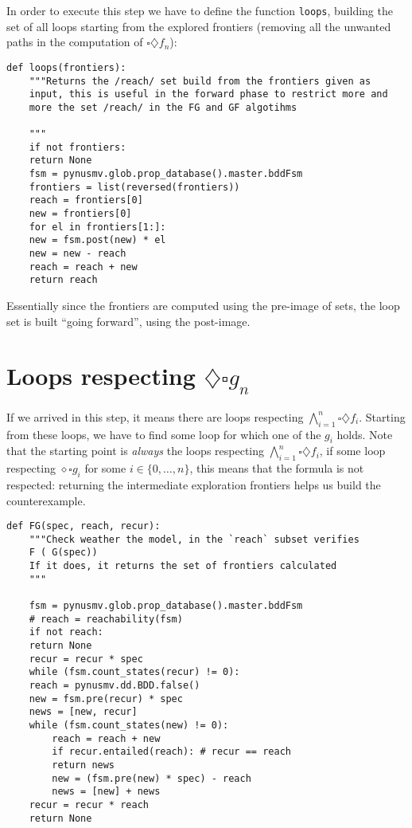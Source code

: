 \documentclass[10pt]{article}
\begin{document}
In order to execute this step we have to define the function
\texttt{loops}, building the set of all loops starting from the explored
frontiers (removing all the unwanted paths in the computation of
\(\square\diamondsuit f_n\)):

\begin{verbatim}
def loops(frontiers):
    """Returns the /reach/ set build from the frontiers given as
    input, this is useful in the forward phase to restrict more and
    more the set /reach/ in the FG and GF algotihms

    """
    if not frontiers:
	return None
    fsm = pynusmv.glob.prop_database().master.bddFsm
    frontiers = list(reversed(frontiers))
    reach = frontiers[0]
    new = frontiers[0]
    for el in frontiers[1:]:
	new = fsm.post(new) * el
	new = new - reach
	reach = reach + new
    return reach
\end{verbatim}
Essentially since the frontiers are computed using the pre-image of
sets, the loop set is built ``going forward'', using the post-image.

\section*{Loops respecting \(\diamondsuit\square g_n\)}
\label{sec:org46b46ad}
If we arrived in this step, it means there are loops respecting
\(\bigwedge_{i=1}^n\square\diamondsuit f_i\). Starting from these
loops, we have to find some loop for which one of the \(g_i\)
holds. Note that the starting point is \emph{always} the loops respecting
\(\bigwedge_{i=1}^n\square\diamondsuit f_i\), if some loop
respecting \(\diamond\square g_i\) for some \(i\in \{0,\dots,n\}\),
this means that the formula is not respected: returning the
intermediate exploration frontiers helps us build the
counterexample.

\begin{verbatim}
def FG(spec, reach, recur):
    """Check weather the model, in the `reach` subset verifies
    F ( G(spec))
    If it does, it returns the set of frontiers calculated
    """

    fsm = pynusmv.glob.prop_database().master.bddFsm
    # reach = reachability(fsm)
    if not reach:
	return None
    recur = recur * spec
    while (fsm.count_states(recur) != 0):
	reach = pynusmv.dd.BDD.false()
	new = fsm.pre(recur) * spec
	news = [new, recur]
	while (fsm.count_states(new) != 0):
	    reach = reach + new 
	    if recur.entailed(reach): # recur == reach
		return news
	    new = (fsm.pre(new) * spec) - reach
	    news = [new] + news
	recur = recur * reach
    return None
\end{verbatim}
\end{document}
